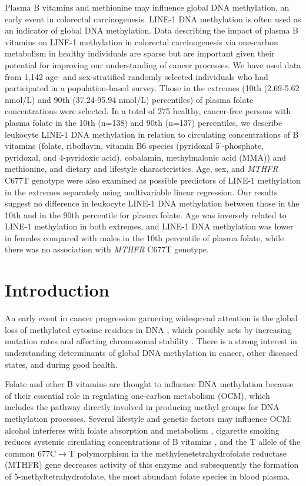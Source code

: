 \noindent Plasma B vitamins and methionine may influence global DNA methylation, an early event in colorectal carcinogenesis. LINE-1 DNA methylation is often used as an indicator of global DNA methylation. Data describing the impact of plasma B vitamins on LINE-1 methylation in colorectal carcinogenesis via one-carbon metabolism in healthy individuals are sparse but are important given their potential for improving our understanding of cancer processes. We have used data from 1,142 age- and sex-stratified randomly selected individuals who had participated in a population-based survey. Those in the extremes (10th (2.69-5.62 nmol/L) and 90th (37.24-95.94 nmol/L) percentiles) of plasma folate concentrations were selected. In a total of 275 healthy, cancer-free persons with plasma folate in the 10th (n=138) and 90th (n=137) percentiles, we describe leukocyte LINE-1 DNA methylation in relation to circulating concentrations of B vitamins (folate, riboflavin, vitamin B6 species (pyridoxal 5'-phosphate, pyridoxal, 
and 4-pyridoxic acid), cobalamin, methylmalonic acid (MMA)) and methionine, and dietary and lifestyle characteristics. Age, sex, and \emph{MTHFR} C677T genotype were also examined as possible predictors of LINE-1 methylation in the extremes separately using multivariable linear regression. Our results suggest no difference in leukocyte LINE-1 DNA methylation between those in the 10th and in the 90th percentile for plasma folate. Age was inversely related to LINE-1 methylation in both extremes, and LINE-1 DNA methylation was lower in females compared with males in the 10th percentile of plasma folate, while there was no association with \emph{MTHFR} C677T genotype.

\newpage

\section[]{Introduction} %
\noindent An early event in cancer progression garnering widespread attention is the global loss of methylated cytosine residues in DNA \cite{c31,c32}, which possibly acts by increasing mutation rates and affecting chromosomal stability \cite{c33,c34}. There is a strong interest in understanding determinants of global DNA methylation in cancer, other diseased states, and during good health.

\noindent Folate and other B vitamins are thought to influence DNA methylation because of their essential role in regulating one-carbon metabolism (OCM), which includes the pathway directly involved in producing methyl groups for DNA methylation processes. Several lifestyle and genetic factors may influence OCM: alcohol interferes with folate absorption and metabolism \cite{c35}, cigarette smoking reduces systemic circulating concentrations of B vitamins \cite{c36}, and the T allele of the common 677C$\rightarrow$T polymorphism in the methylenetetrahydrofolate reductase (MTHFR) gene decreases activity of this enzyme and subsequently the formation of 5-methyltetrahydrofolate, the most abundant folate species in blood plasma.

